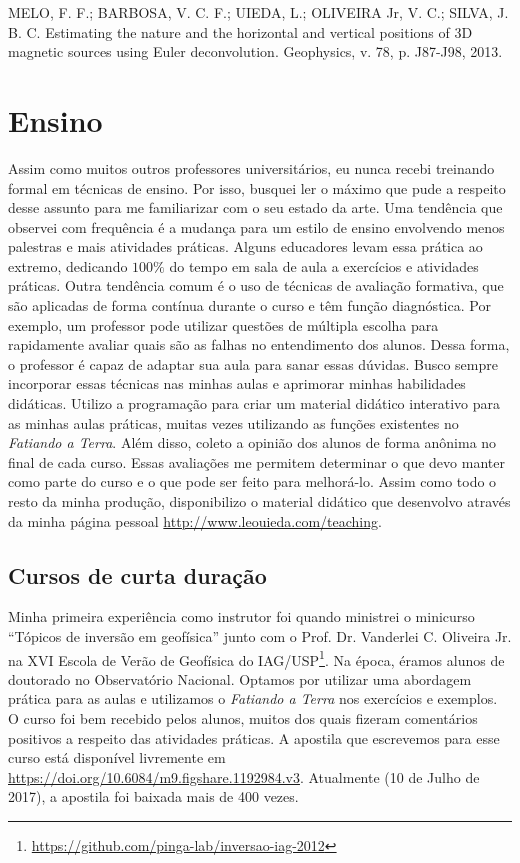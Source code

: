 \documentclass[12pt,a4paper,oneside,titlepage,onecolumn]{article}
\begin{document}
\begin{displayquote}
    MELO, F. F.; BARBOSA, V. C. F.; UIEDA, L.; OLIVEIRA Jr, V. C.; SILVA, J. B.
    C.  Estimating the nature and the horizontal and vertical positions of 3D
    magnetic sources using Euler deconvolution. Geophysics, v. 78, p. J87-J98,
    2013.
\end{displayquote}


\section{Ensino}

Assim como muitos outros professores universitários, eu nunca recebi treinando
formal em técnicas de ensino.
Por isso, busquei ler o máximo que pude a respeito desse assunto para me
familiarizar com o seu estado da arte.
Uma tendência que observei com frequência é a mudança para um estilo de ensino
envolvendo menos palestras e mais atividades práticas.
Alguns educadores levam essa prática ao extremo, dedicando $100\%$ do tempo em
sala de aula a exercícios e atividades práticas.
Outra tendência comum é o uso de técnicas de avaliação formativa, que são
aplicadas de forma contínua durante o curso e têm função diagnóstica.
Por exemplo, um professor pode utilizar questões de múltipla escolha para
rapidamente avaliar quais são as falhas no entendimento dos alunos.
Dessa forma, o professor é capaz de adaptar sua aula para sanar essas dúvidas.
Busco sempre incorporar essas técnicas nas minhas aulas e aprimorar minhas
habilidades didáticas.
Utilizo a programação para criar um material didático interativo para as minhas
aulas práticas, muitas vezes utilizando as funções existentes no
\textit{Fatiando a Terra}.
Além disso, coleto a opinião dos alunos de forma anônima no final de cada
curso.
Essas avaliações me permitem determinar o que devo manter como parte do curso e
o que pode ser feito para melhorá-lo.
Assim como todo o resto da minha produção, disponibilizo o material didático
que desenvolvo através da minha página pessoal
\url{http://www.leouieda.com/teaching}.


\subsection{Cursos de curta duração}

Minha primeira experiência como instrutor foi quando ministrei o minicurso
``Tópicos de inversão em geofísica'' junto com o Prof. Dr. Vanderlei C.
Oliveira Jr. na XVI Escola de Verão de Geofísica do
IAG/USP\footnote{\url{https://github.com/pinga-lab/inversao-iag-2012}}.
Na época, éramos alunos de doutorado no Observatório Nacional.
Optamos por utilizar uma abordagem prática para as aulas e utilizamos o
\textit{Fatiando a Terra} nos exercícios e exemplos.
O curso foi bem recebido pelos alunos, muitos dos quais fizeram comentários
positivos a respeito das atividades práticas.
A apostila que escrevemos para esse curso está disponível livremente em
\url{https://doi.org/10.6084/m9.figshare.1192984.v3}.
Atualmente (10 de Julho de 2017), a apostila foi baixada mais de 400 vezes.
\end{document}
